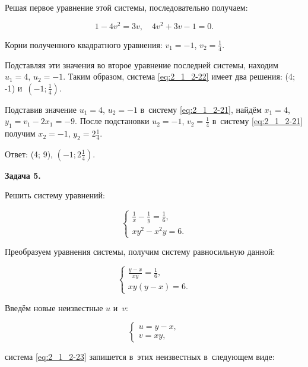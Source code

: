 Решая первое уравнение этой системы, последовательно получаем:

\begin{equation*}
1 - 4v^{2} = 3v, \quad
4v^{2} + 3v - 1 = 0.
\end{equation*}

Корни полученного квадратного уравнения:
$v_{1} = -1$, $\displaystyle v_{2} = \frac{1}{4}$.

Подставляя эти значения во второе уравнение последней системы, находим
$u_{1} = 4$, $u_{2} = -1$.
Таким образом, система \eqref{eq:2_1_2-22} имеет два решения:
(4; -1) и~$\left(-1; \displaystyle \frac{1}{4}\right)$.

Подставив значение $u_{1} = 4$, $u_{2} = -1$ в~систему \eqref{eq:2_1_2-21},
найдём $x_{1} = 4$, $y_{1} = v_{1} - 2x_{1} = -9$.
После подстановки $u_{2} = -1$, $\displaystyle v_{2} = \frac{1}{4}$
в~систему \eqref{eq:2_1_2-21} получим
$x_{2} = -1$, $\displaystyle y_{2} = 2\frac{1}{4}$.

Ответ: (4; 9), $\left(-1; \displaystyle 2\frac{1}{4}\right)$.

\hypertarget{ex:2_1_2_5}{\textbf{Задача 5.}} Решить систему уравнений:

\begin{equation*}
\begin{cases}
\displaystyle \frac{1}{x} - \frac{1}{y} = \frac{1}{6}, \\[10pt]
xy^{2} - x^{2}y = 6.
\end{cases}
\end{equation*}

Преобразуем уравнения системы, получим систему равносильную данной:

\begin{equation}\label{eq:2_1_2-23}
\begin{cases}
\displaystyle \frac{y - x}{xy} = \frac{1}{6}, \\[10pt]
xy(y - x) = 6.
\end{cases}
\end{equation}

Введём новые неизвестные $u$ и~$v$:

\begin{equation}\label{eq:2_1_2-24}
\begin{cases}
u = y - x, \\
v = xy,
\end{cases}
\end{equation}

система \eqref{eq:2_1_2-23} запишется в~этих неизвестных в~следующем виде:


